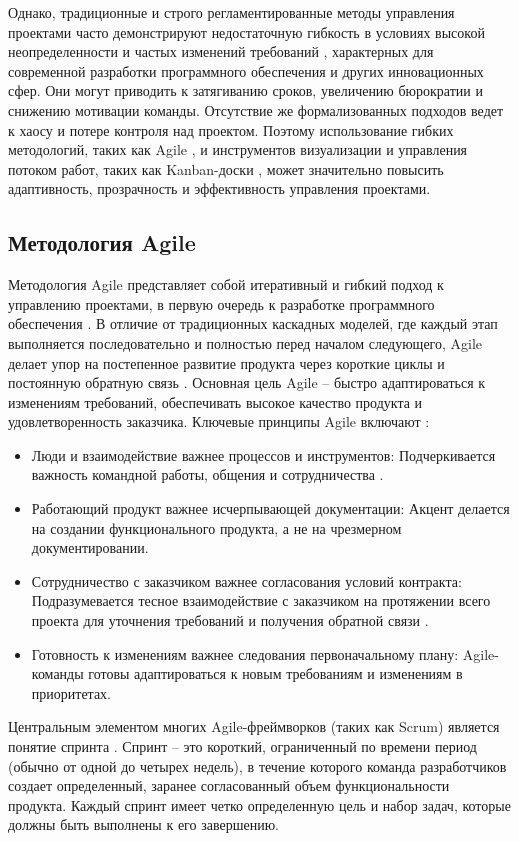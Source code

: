 Однако, традиционные и строго регламентированные методы управления проектами часто демонстрируют недостаточную гибкость в условиях высокой неопределенности и частых изменений требований \cite{management6}, характерных для современной разработки программного обеспечения и других инновационных сфер. Они могут приводить к затягиванию сроков, увеличению бюрократии и снижению мотивации команды. Отсутствие же формализованных подходов ведет к хаосу и потере контроля над проектом. Поэтому использование гибких методологий, таких как Agile \cite{agile4}, и инструментов визуализации и управления потоком работ, таких как Kanban-доски \cite{kanban1}, может значительно повысить адаптивность, прозрачность и эффективность управления проектами.

\subsection{Методология Agile}
Методология Agile представляет собой итеративный и гибкий подход к управлению проектами, в первую очередь к разработке программного обеспечения \cite{agile1}. В отличие от традиционных каскадных моделей, где каждый этап выполняется последовательно и полностью перед началом следующего, Agile делает упор на постепенное развитие продукта через короткие циклы и постоянную обратную связь \cite{agile5}. Основная цель Agile – быстро адаптироваться к изменениям требований, обеспечивать высокое качество продукта и удовлетворенность заказчика.
Ключевые принципы Agile включают \cite{website_agilemanifesto1}:

\begin{itemize}
	\item Люди и взаимодействие важнее процессов и инструментов: Подчеркивается важность командной работы, общения и сотрудничества \cite{agile5}.
	\item Работающий продукт важнее исчерпывающей документации: Акцент делается на создании функционального продукта, а не на чрезмерном документировании.
	\item Сотрудничество с заказчиком важнее согласования условий контракта: Подразумевается тесное взаимодействие с заказчиком на протяжении всего проекта для уточнения требований и получения обратной связи \cite{agile2}.
	\item Готовность к изменениям важнее следования первоначальному плану: Agile-команды готовы адаптироваться к новым требованиям и изменениям в приоритетах.
\end{itemize}

Центральным элементом многих Agile-фреймворков (таких как Scrum) является понятие спринта \cite{agile1}. Спринт – это короткий, ограниченный по времени период (обычно от одной до четырех недель), в течение которого команда разработчиков создает определенный, заранее согласованный объем функциональности продукта. Каждый спринт имеет четко определенную цель и набор задач, которые должны быть выполнены к его завершению.

